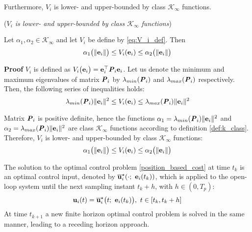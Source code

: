 Furthermore, $V_i$ is lower- and upper-bounded by class $\mathcal{K}_{\infty}$ functions.

\begin{bw_box}
  \begin{lemma} (\textit{$V_i$ is lower- and upper-bounded by class
      \label{lemma:V_i_lower_upper_bounded}
    $\mathcal{K}_{\infty}$ functions})
  \end{lemma}

  Let $\alpha_1, \alpha_2 \in \mathcal{K}_{\infty}$ and let
  $V_i$ be define by \eqref{eq:V_i_def}. Then
  \begin{align}
    \alpha_1\big(\|\bm{\mathbf{e}}_i\|\big) \leq V_i(\bm{\mathbf{e}}_i) \leq \alpha_2\big(\| \bm{\mathbf{e}}_i \|\big)
  \end{align}

\end{bw_box}

\begin{gg_box}
  \textbf{Proof}
  $V_i$ is defined as
  $V_i\big(\bm{\mathbf{e}}_i\big) = \bm{\mathbf{e}}_i^{\top} \bm{\mathit{P}}_i \bm{\mathbf{e}}_i$.
  Let us denote the minimum and maximum eigenvalues of matrix $\bm{\mathit{P}}_i$ by
  $\lambda_{min}(\bm{\mathit{P}}_i)$ and $\lambda_{max}(\bm{\mathit{P}}_i)$ respectively.
  Then, the following series of inequalities holds:
\begin{align}
  \lambda_{min}(\bm{\mathit{P}}_i) \|\bm{\mathbf{e}}_i\|^2 \leq V_i(\bm{\mathbf{e}}_i) \leq \lambda_{max}(\bm{\mathit{P}}_i) \|\bm{\mathbf{e}}_i\|^2
\end{align}

Matrix $\bm{\mathit{P}}_i$ is positive definite, hence the functions
$\alpha_1 = \lambda_{min}(\bm{\mathit{P}}_i) \|\bm{\mathbf{e}}_i\|^2$ and
$\alpha_2 = \lambda_{max}(\bm{\mathit{P}}_i) \|\bm{\mathbf{e}}_i\|^2$ are
class $\mathcal{K}_{\infty}$ functions according to definition \eqref{def:k_class}.
Therefore, $V_i$ is lower- and upper-bounded by class $\mathcal{K}_{\infty}$
functions:
\begin{align}
  \alpha_1\big(\|\bm{\mathbf{e}}_i\|\big) \leq V_i(\bm{\mathbf{e}}_i) \leq \alpha_2\big(\| \bm{\mathbf{e}}_i \|\big)
\end{align}
\qedsymbol
\end{gg_box}


The solution to the optimal control problem \eqref{position_based_cost}
at time $t_k$ is an optimal control input, denoted by
$\overline{\bm{\mathbf{u}}}_i^{\star}(\cdot;\ \bm{\mathbf{e}}_i(t_k))$, which
is applied to the open-loop system until the next sampling instant $t_k + h$,
with $h \in (0,T_p)$:
\begin{align}
  \bm{\mathbf{u}}_i(t) = \overline{\bm{\mathbf{u}}}_i^{\star}\big(t;\ \bm{\mathbf{e}}_i(t_k)\big),\  t \in [t_k, t_k + h]
 \label{eq:position_based_optimal_u}
\end{align}
At time $t_{k+1}$ a new finite horizon optimal control problem is solved in the
same manner, leading to a receding horizon approach.

